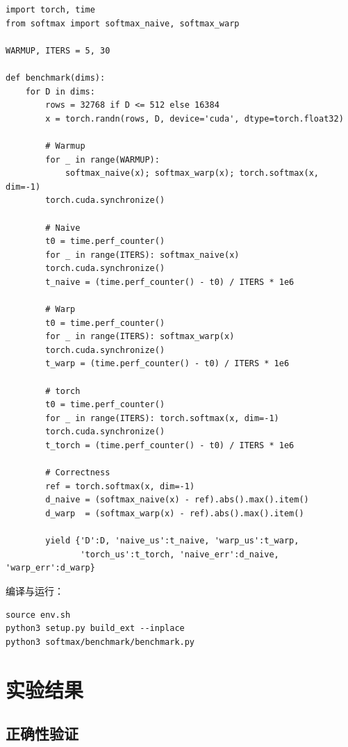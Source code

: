 \documentclass[12pt,a4paper]{ctexart}
\begin{document}
\begin{lstlisting}[style=python, caption={性能测试脚本 (benchmark.py)}]
import torch, time
from softmax import softmax_naive, softmax_warp

WARMUP, ITERS = 5, 30

def benchmark(dims):
    for D in dims:
        rows = 32768 if D <= 512 else 16384
        x = torch.randn(rows, D, device='cuda', dtype=torch.float32)

        # Warmup
        for _ in range(WARMUP):
            softmax_naive(x); softmax_warp(x); torch.softmax(x, dim=-1)
        torch.cuda.synchronize()

        # Naive
        t0 = time.perf_counter()
        for _ in range(ITERS): softmax_naive(x)
        torch.cuda.synchronize()
        t_naive = (time.perf_counter() - t0) / ITERS * 1e6

        # Warp
        t0 = time.perf_counter()
        for _ in range(ITERS): softmax_warp(x)
        torch.cuda.synchronize()
        t_warp = (time.perf_counter() - t0) / ITERS * 1e6

        # torch
        t0 = time.perf_counter()
        for _ in range(ITERS): torch.softmax(x, dim=-1)
        torch.cuda.synchronize()
        t_torch = (time.perf_counter() - t0) / ITERS * 1e6

        # Correctness
        ref = torch.softmax(x, dim=-1)
        d_naive = (softmax_naive(x) - ref).abs().max().item()
        d_warp  = (softmax_warp(x) - ref).abs().max().item()

        yield {'D':D, 'naive_us':t_naive, 'warp_us':t_warp,
               'torch_us':t_torch, 'naive_err':d_naive, 'warp_err':d_warp}
\end{lstlisting}

编译与运行：
\begin{lstlisting}[style=shell]
source env.sh
python3 setup.py build_ext --inplace
python3 softmax/benchmark/benchmark.py
\end{lstlisting}

\section{实验结果}

\subsection{正确性验证}
\end{document}
